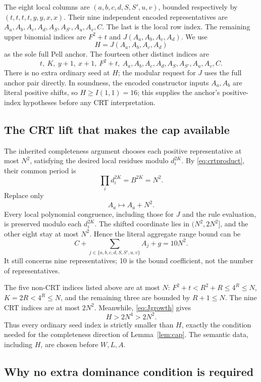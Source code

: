 \documentclass[11pt,a4paper]{article}
\theoremstyle{remark}
\begin{document}
The eight local columns are \((a,b,c,d,S,S',u,v)\), bounded respectively
by \((t,t,t,t,y,y,x,x)\). Their nine independent encoded representatives
are \(A_a,A_b,A_c,A_d,A_S,A_{S'},A_u,A_v,C\). The last is the local
row index. The remaining upper binomial indices are \(F^2+t\) and
\(J(A_a,A_b,A_c,A_d)\). We use
\[
 H=J(A_a,A_b,A_c,A_d)
\]
as the sole full Pell anchor. The fourteen other distinct indices are
\[
 t,\ K,\ y+1,\ x+1,\ F^2+t,
 \ A_a,A_b,A_c,A_d,A_S,A_{S'},A_u,A_v,C.
\]
There is no extra ordinary seed at \(H\); the modular request for \(J\)
uses the full anchor pair directly.
In soundness, the encoded constructor inputs \(A_a,A_b\) are literal
positive shifts, so \(H\ge I(1,1)=16\); this supplies the anchor's
positive-index hypotheses before any CRT interpretation.

\subsection{The CRT lift that makes the cap available}

The inherited completeness argument chooses each positive representative
at most \(N^2\), satisfying the desired local residues modulo
\(d_i^{2K}\). By \eqref{eq:crtproduct}, their common period is
\[
 \prod_i d_i^{2K}=B^{2K}=N^2.
\]
Replace only
\begin{equation}\label{eq:lift}
 A_a\longmapsto A_a+N^2.
\end{equation}
Every local polynomial congruence, including those for \(J\) and the rule
evaluation, is preserved modulo each \(d_i^{2K}\). The shifted coordinate
lies in \((N^2,2N^2]\), and the other eight stay at most \(N^2\). Hence
the literal aggregate range bound can be
\begin{equation}\label{eq:tenbudget}
 C+\sum_{j\in\{a,b,c,d,S,S',u,v\}}A_j+g=10N^2.
\end{equation}
It still concerns nine representatives; 10 is the bound coefficient,
not the number of representatives.

The five non-CRT indices listed above are at most \(N\):
\(F^2+t<R^2+R\le4^R\le N\), \(K=2R<4^R\le N\), and the remaining
three are bounded by \(R+1\le N\). The nine CRT indices are at most
\(2N^2\). Meanwhile, \eqref{eq:Jgrowth} gives
\[
 H>2N^4>2N^2.
\]
Thus every ordinary seed index is strictly smaller than \(H\), exactly
the condition needed for the completeness direction of Lemma~\ref{lem:cap}.
The semantic data, including \(H\), are chosen before \(W,L,A\).

\subsection{Why no extra dominance condition is required}
\end{document}
